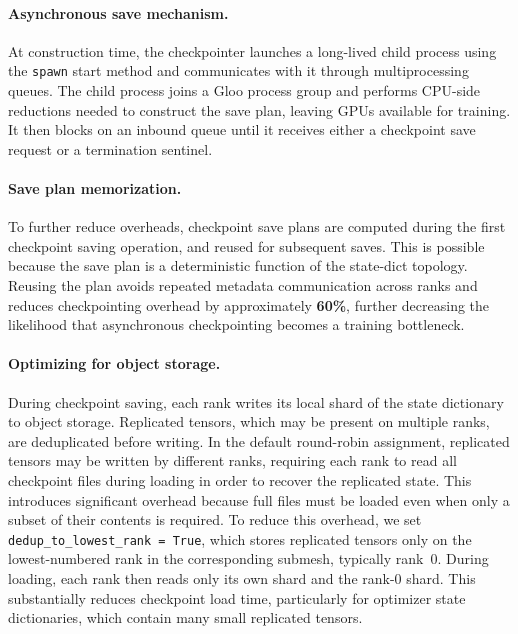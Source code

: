 

\paragraph{Asynchronous save mechanism.} At construction time, the checkpointer launches a long-lived child process using the \texttt{spawn} start method and communicates with it through multiprocessing queues. The child process joins a Gloo process group and performs CPU-side reductions needed to construct the save plan, leaving GPUs available for training. It then blocks on an inbound queue until it receives either a checkpoint save request or a termination sentinel.

\paragraph{Save plan memorization.} To further reduce overheads, checkpoint save plans are computed during the first checkpoint saving operation, and reused for subsequent saves. This is possible because the save plan is a deterministic function of the state-dict topology. Reusing the plan avoids repeated metadata communication across ranks and reduces checkpointing overhead by approximately \textbf{60\%}, further decreasing the likelihood that asynchronous checkpointing becomes a training bottleneck.

\paragraph{Optimizing for object storage.} During checkpoint saving, each rank writes its local shard of the state dictionary to object storage. Replicated tensors, which may be present on multiple ranks, are deduplicated before writing. In the default round-robin assignment, replicated tensors may be written by different ranks, requiring each rank to read all checkpoint files during loading in order to recover the replicated state. This introduces significant overhead because full files must be loaded even when only a subset of their contents is required. To reduce this overhead, we set \texttt{dedup\_to\_lowest\_rank = True}, which stores replicated tensors only on the lowest-numbered rank in the corresponding submesh, typically rank~0. During loading, each rank then reads only its own shard and the rank-0 shard. This substantially reduces checkpoint load time, particularly for optimizer state dictionaries, which contain many small replicated tensors.

